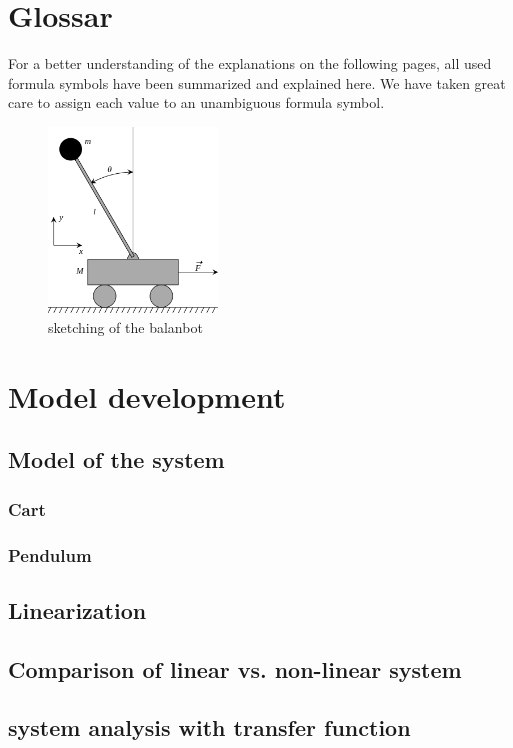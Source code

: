\section{Glossar}
For a better understanding of the explanations on the following pages, all used formula symbols have been summarized and explained here. We have taken great care to assign each value to an unambiguous formula symbol.
\begin{figure}[H]
    \centering
    \includegraphics[width=0.4\textwidth]{Lab_report/pics/modelBuilding/300px-Cart-pendulum.svg.png}
    \caption{sketching of the balanbot}
    \label{fig:balanbot_sketch}
\end{figure}


\section{Model development}
\subsection{Model of the system}
\subsubsection{Cart}

\subsubsection{Pendulum}

\subsection{Linearization}

\subsection{Comparison of linear vs. non-linear system}

\subsection{system analysis with transfer function}